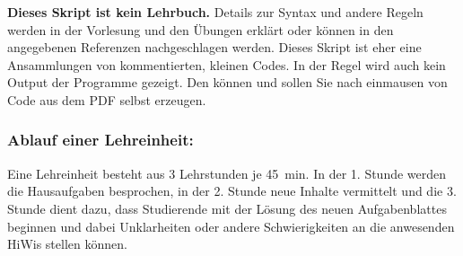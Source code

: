 \textbf{Dieses Skript ist kein Lehrbuch.} Details zur Syntax und andere Regeln werden in der Vorlesung und den Übungen erklärt oder können in den angegebenen Referenzen nachgeschlagen werden. Dieses Skript ist eher eine Ansammlungen von kommentierten, kleinen Codes. In der Regel wird auch kein Output der Programme gezeigt. Den können und sollen Sie nach einmausen von Code aus dem PDF selbst erzeugen. 

\subsubsection{Ablauf einer Lehreinheit:} Eine Lehreinheit besteht aus 3 Lehrstunden je 45~min. In der 1. Stunde werden die Hausaufgaben besprochen, in der 2. Stunde neue Inhalte vermittelt und die 3. Stunde dient dazu, dass Studierende mit der Lösung des neuen Aufgabenblattes beginnen und dabei Unklarheiten oder andere Schwierigkeiten an die anwesenden HiWis stellen können.

